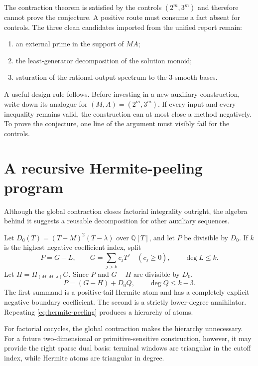 \documentclass[11pt,oneside]{article}
\theoremstyle{definition}
\theoremstyle{remark}
\newcommand{\Q}{\mathbb Q}
\begin{document}
The contraction theorem is satisfied by the controls $(2^m,3^m)$ and therefore cannot prove
the conjecture.  A positive route must consume a fact absent for controls.  The three clean
candidates imported from the unified report remain:

\begin{enumerate}
\item an external prime in the support of $MA$;
\item the least-generator decomposition of the solution monoid;
\item saturation of the rational-output spectrum to the $3$-smooth bases.
\end{enumerate}

A useful design rule follows.  Before investing in a new auxiliary construction, write down
its analogue for $(M,A)=(2^m,3^m)$.  If every input and every inequality remains valid, the
construction can at most close a method negatively.  To prove the conjecture, one line of the
argument must visibly fail for the controls.

\section{A recursive Hermite-peeling program}
\label{sec:peeling}

Although the global contraction closes factorial integrality outright, the algebra behind it
suggests a reusable decomposition for other auxiliary sequences.

Let $D_0(T)=(T-M)^2(T-\lambda)$ over $\Q[T]$, and let $P$ be divisible by $D_0$.  If $k$ is
the highest negative coefficient index, split
\[
 P=G+L,
 \qquad
 G=\sum_{j>k}c_jT^j\quad(c_j\ge0),
 \qquad \deg L\le k.
\]
Let $H=H_{(M,M,\lambda)}G$.  Since $P$ and $G-H$ are divisible by $D_0$,
\begin{equation}
 P=(G-H)+D_0Q,
 \qquad \deg Q\le k-3.                              \label{eq:hermite-peeling}
\end{equation}
The first summand is a positive-tail Hermite atom and has a completely explicit negative
boundary coefficient.  The second is a strictly lower-degree annihilator.  Repeating
\eqref{eq:hermite-peeling} produces a hierarchy of atoms.

For factorial cocycles, the global contraction makes the hierarchy unnecessary.  For a
future two-dimensional or primitive-sensitive construction, however, it may provide the
right sparse dual basis: terminal windows are triangular in the cutoff index, while Hermite
atoms are triangular in degree.
\end{document}
